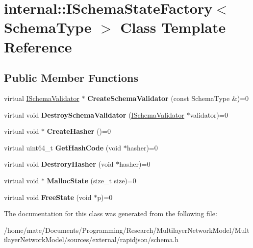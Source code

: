 \hypertarget{classinternal_1_1ISchemaStateFactory}{}\section{internal\+:\+:I\+Schema\+State\+Factory$<$ Schema\+Type $>$ Class Template Reference}
\label{classinternal_1_1ISchemaStateFactory}
\subsection*{Public Member Functions}
\begin{DoxyCompactItemize}
\item 
virtual \hyperlink{classinternal_1_1ISchemaValidator}{I\+Schema\+Validator} $\ast$ {\bfseries Create\+Schema\+Validator} (const Schema\+Type \&)=0\hypertarget{classinternal_1_1ISchemaStateFactory_ae8c98fcff6a057b4fcd9018fc14551a8}{}\label{classinternal_1_1ISchemaStateFactory_ae8c98fcff6a057b4fcd9018fc14551a8}

\item 
virtual void {\bfseries Destroy\+Schema\+Validator} (\hyperlink{classinternal_1_1ISchemaValidator}{I\+Schema\+Validator} $\ast$validator)=0\hypertarget{classinternal_1_1ISchemaStateFactory_a112cbf154077050bc30ffe670032442c}{}\label{classinternal_1_1ISchemaStateFactory_a112cbf154077050bc30ffe670032442c}

\item 
virtual void $\ast$ {\bfseries Create\+Hasher} ()=0\hypertarget{classinternal_1_1ISchemaStateFactory_a4ac37b9d3e9526004c82692473f978f4}{}\label{classinternal_1_1ISchemaStateFactory_a4ac37b9d3e9526004c82692473f978f4}

\item 
virtual uint64\+\_\+t {\bfseries Get\+Hash\+Code} (void $\ast$hasher)=0\hypertarget{classinternal_1_1ISchemaStateFactory_addfcf00963cc777edf642b204f07c8d6}{}\label{classinternal_1_1ISchemaStateFactory_addfcf00963cc777edf642b204f07c8d6}

\item 
virtual void {\bfseries Destrory\+Hasher} (void $\ast$hasher)=0\hypertarget{classinternal_1_1ISchemaStateFactory_a70b8d88180d2e6993105b17f19101635}{}\label{classinternal_1_1ISchemaStateFactory_a70b8d88180d2e6993105b17f19101635}

\item 
virtual void $\ast$ {\bfseries Malloc\+State} (size\+\_\+t size)=0\hypertarget{classinternal_1_1ISchemaStateFactory_ada92ebf8e9ef994f7e20a0f7f9750519}{}\label{classinternal_1_1ISchemaStateFactory_ada92ebf8e9ef994f7e20a0f7f9750519}

\item 
virtual void {\bfseries Free\+State} (void $\ast$p)=0\hypertarget{classinternal_1_1ISchemaStateFactory_a27bd2138940cac3c330dd8399c49b22b}{}\label{classinternal_1_1ISchemaStateFactory_a27bd2138940cac3c330dd8399c49b22b}

\end{DoxyCompactItemize}


The documentation for this class was generated from the following file\+:\begin{DoxyCompactItemize}
\item 
/home/mate/\+Documents/\+Programming/\+Research/\+Multilayer\+Network\+Model/\+Multilayer\+Network\+Model/sources/external/rapidjson/schema.\+h\end{DoxyCompactItemize}
